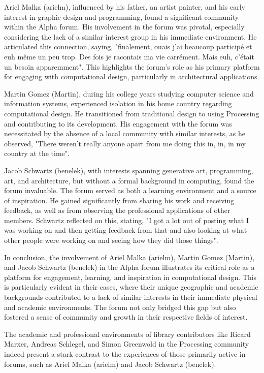 Ariel Malka (arielm), influenced by his father, an artist painter, and his early interest in graphic design and programming, found a significant community within the Alpha forum. His involvement in the forum was pivotal, especially considering the lack of a similar interest group in his immediate environment. He articulated this connection, saying, "finalement, ouais j'ai beaucoup participé et euh même un peu trop. Des fois je racontais ma vie carrément. Mais euh, c'était un besoin apparemment"​​. This highlights the forum's role as his primary platform for engaging with computational design, particularly in architectural applications.

Martin Gomez (Martin), during his college years studying computer science and information systems, experienced isolation in his home country regarding computational design. He transitioned from traditional design to using Processing and contributing to its development. His engagement with the forum was necessitated by the absence of a local community with similar interests, as he observed, "There weren't really anyone apart from me doing this in, in, in my country at the time"​​.

Jacob Schwartz (benelek), with interests spanning generative art, programming, art, and architecture, but without a formal background in computing, found the forum invaluable. The forum served as both a learning environment and a source of inspiration. He gained significantly from sharing his work and receiving feedback, as well as from observing the professional applications of other members. Schwartz reflected on this, stating, "I got a lot out of posting what I was working on and then getting feedback from that and also looking at what other people were working on and seeing how they did those things"​​.

In conclusion, the involvement of Ariel Malka (arielm), Martin Gomez (Martin), and Jacob Schwartz (benelek) in the Alpha forum illustrates its critical role as a platform for engagement, learning, and inspiration in computational design. This is particularly evident in their cases, where their unique geographic and academic backgrounds contributed to a lack of similar interests in their immediate physical and academic environments. The forum not only bridged this gap but also fostered a sense of community and growth in their respective fields of interest.

The academic and professional environments of library contributors like Ricard Marxer, Andreas Schlegel, and Simon Greenwold in the Processing community indeed present a stark contrast to the experiences of those primarily active in forums, such as Ariel Malka (arielm) and Jacob Schwartz (benelek).

